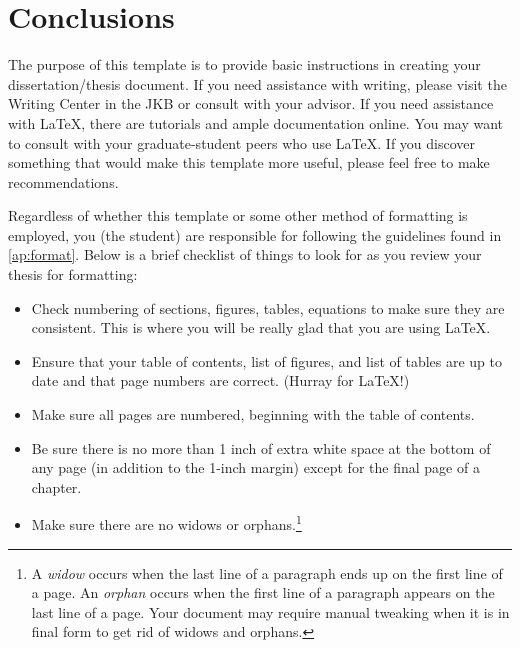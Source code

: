 \chapter{Conclusions}

The purpose of this template is to provide basic instructions in creating your dissertation/thesis document. If you need assistance with writing, please visit the Writing Center in the JKB or consult with your advisor. If you need assistance with \LaTeX, there are tutorials and ample documentation online. You may want to consult with your graduate-student peers who use \LaTeX. If you discover something that would make this template more useful, please feel free to make recommendations.

Regardless of whether this template or some other method of formatting is employed, you (the student) are responsible for following the guidelines found in \cref{ap:format}. Below is a brief checklist of things to look for as you review your thesis for formatting:
\begin{itemize}
	\item Check numbering of sections, figures, tables, equations to make sure they are consistent.	This is where you will be really glad that you are using \LaTeX.
	\item Ensure that your table of contents, list of figures, and list of tables are up to date and that page numbers are correct. (Hurray for \LaTeX!)
	\item Make sure all pages are numbered, beginning with the table of contents.
	\item Be sure there is no more than 1 inch of extra white space at the bottom of any page (in addition to the 1-inch margin) except for the final page of a chapter.
	\item Make sure there are no widows or orphans.\footnote{A \emph{widow} occurs when the last line of a paragraph ends up on the first line of a page. An \emph{orphan} occurs when the first line of a paragraph appears on the last line of a page. Your document may require manual tweaking when it is in final form to get rid of widows and orphans.}
\end{itemize}

